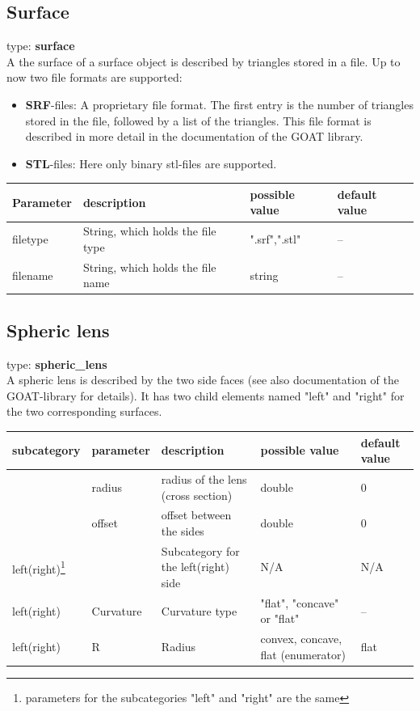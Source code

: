 \documentclass[a4paper,html,11pt,openany]{book}
\begin{document}
\subsection{Surface}
type: \textbf{surface} \\
A the surface of a surface object is described by triangles stored in a file. Up to now two file formats are supported:
\begin{itemize}
\item {\bf SRF}-files: A proprietary file format. The first entry is the number of triangles stored in the file, followed by a list of the triangles. This file format is described in more detail in the documentation of the GOAT library. 
\item {\bf STL}-files: Here only binary stl-files are supported. 
\end{itemize} 

 
\vspace{1em} 
\begin{tabular}{p{2cm}|m{3.5cm}|m{3.0cm}|p{1.7cm}}
 Parameter  & description  & possible value & default value\\
 \hline
 filetype & String, which holds the file type & ".srf",".stl" & -- \\
 filename & String, which holds the file name & string & -- \\
 \end{tabular}
 
\subsection{Spheric lens}
type: \textbf{spheric\_lens} \\
A spheric lens is described by the two side faces (see also documentation of the GOAT-library for details). It has two child elements named "left" and "right" for the two corresponding surfaces. 

 
\vspace{1em} 
\begin{tabular}{p{2cm}|m{2cm}|m{2.5cm}|m{2.0cm}|p{1.7cm}}
 subcategory  & parameter & description  & possible value & default value\\
 \hline
 & radius  & radius of the lens (cross section) & double & 0 \\
 \hline
 & offset & offset between the sides & double & 0 \\
 \hline
 left(right)\footnote{parameters for the subcategories "left" and "right" are the same} & & Subcategory for the left(right) side & N/A & N/A  \\
 \hline
  left(right) & Curvature & Curvature type & "flat", "concave" or "flat" & --  \\
    left(right) & R & Radius  & convex, concave, flat (enumerator)  & flat  \\
 \end{tabular}
 
\end{document}
